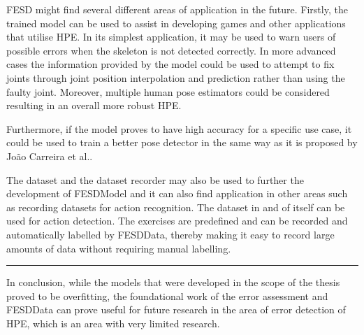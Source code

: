 FESD might find several different areas of application in the future. Firstly, the trained model can be used to assist in developing games and other applications that utilise HPE. In its simplest application, it may be used to warn users of possible errors when the skeleton is not detected correctly. In more advanced cases the information provided by the model could be used to attempt to fix joints through joint position interpolation and prediction rather than using the faulty joint. Moreover, multiple human pose estimators could be considered resulting in an overall more robust HPE.

Furthermore, if the model proves to have high accuracy for a specific use case, it could be used to train a better pose detector in the same way as it is proposed by Jo\~ao Carreira et al.\cite{IterativeErrorFeedback}.

The dataset and the dataset recorder may also be used to further the development of FESDModel and it can also find application in other areas such as recording datasets for action recognition. The dataset in and of itself can be used for action detection. The exercises are predefined and can be recorded and automatically labelled by FESDData, thereby making it easy to record large amounts of data without requiring manual labelling.

\noindent\rule[0.5pt]{\linewidth}{1pt}

In conclusion, while the models that were developed in the scope of the thesis proved to be overfitting, the foundational work of the error assessment and FESDData can prove useful for future research in the area of error detection of HPE, which is an area with very limited research.